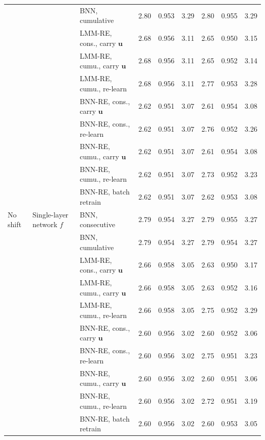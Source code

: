 \begin{tabular}{ll l ccc ccc}
 &  & BNN, cumulative & 2.80 & 0.953 & 3.29 & 2.80 & 0.955 & 3.29 \\
 &  & LMM-RE, cons., carry $\bm u$ & 2.68 & 0.956 & 3.11 & 2.65 & 0.950 & 3.15 \\
 &  & LMM-RE, cumu., carry $\bm u$ & 2.68 & 0.956 & 3.11 & 2.65 & 0.952 & 3.14 \\
 &  & LMM-RE, cumu., re-learn & 2.68 & 0.956 & 3.11 & 2.77 & 0.953 & 3.28 \\
 &  & BNN-RE, cons., carry $\bm u$ & 2.62 & 0.951 & 3.07 & 2.61 & 0.954 & 3.08 \\
 &  & BNN-RE, cons., re-learn & 2.62 & 0.951 & 3.07 & 2.76 & 0.952 & 3.26 \\
 &  & BNN-RE, cumu., carry $\bm u$ & 2.62 & 0.951 & 3.07 & 2.61 & 0.954 & 3.08 \\
 &  & BNN-RE, cumu., re-learn & 2.62 & 0.951 & 3.07 & 2.73 & 0.952 & 3.23 \\
 &  & BNN-RE, batch retrain & 2.62 & 0.951 & 3.07 & 2.62 & 0.953 & 3.08 \\
\hline
No shift & Single-layer network $f$ & BNN, consecutive & 2.79 & 0.954 & 3.27 & 2.79 & 0.955 & 3.27 \\
 &  & BNN, cumulative & 2.79 & 0.954 & 3.27 & 2.79 & 0.954 & 3.27 \\
 &  & LMM-RE, cons., carry $\bm u$ & 2.66 & 0.958 & 3.05 & 2.63 & 0.950 & 3.17 \\
 &  & LMM-RE, cumu., carry $\bm u$ & 2.66 & 0.958 & 3.05 & 2.63 & 0.952 & 3.16 \\
 &  & LMM-RE, cumu., re-learn & 2.66 & 0.958 & 3.05 & 2.75 & 0.952 & 3.29 \\
 &  & BNN-RE, cons., carry $\bm u$ & 2.60 & 0.956 & 3.02 & 2.60 & 0.952 & 3.06 \\
 &  & BNN-RE, cons., re-learn & 2.60 & 0.956 & 3.02 & 2.75 & 0.951 & 3.23 \\
 &  & BNN-RE, cumu., carry $\bm u$ & 2.60 & 0.956 & 3.02 & 2.60 & 0.951 & 3.06 \\
 &  & BNN-RE, cumu., re-learn & 2.60 & 0.956 & 3.02 & 2.72 & 0.951 & 3.19 \\
 &  & BNN-RE, batch retrain & 2.60 & 0.956 & 3.02 & 2.60 & 0.953 & 3.05 \\
\hline
\end{tabular}